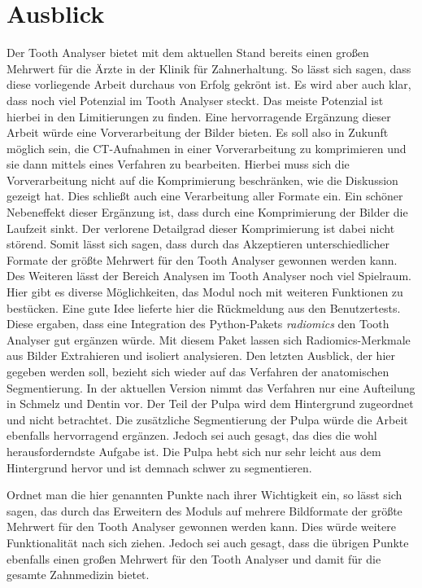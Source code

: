 \chapter{Ausblick}
\label{chap:schlussfolgerung} Der Tooth Analyser bietet mit dem aktuellen Stand bereits
einen großen Mehrwert für die Ärzte in der Klinik für Zahnerhaltung. So lässt
sich sagen, dass diese vorliegende Arbeit durchaus von Erfolg gekrönt ist. Es
wird aber auch klar, dass noch viel Potenzial im Tooth Analyser steckt. Das
meiste Potenzial ist hierbei in den Limitierungen zu finden. Eine hervorragende Ergänzung
dieser Arbeit würde eine Vorverarbeitung der Bilder bieten. Es soll also in
Zukunft möglich sein, die \ac{CT}-Aufnahmen in einer Vorverarbeitung zu
komprimieren und sie dann mittels eines Verfahren zu bearbeiten. Hierbei muss sich
die Vorverarbeitung nicht auf die Komprimierung beschränken, wie die Diskussion
gezeigt hat. Dies schließt auch eine Verarbeitung aller Formate ein. Ein schöner
Nebeneffekt dieser Ergänzung ist, dass durch eine Komprimierung der Bilder die Laufzeit
sinkt. Der verlorene Detailgrad dieser Komprimierung ist dabei nicht störend. Somit
lässt sich sagen, dass durch das Akzeptieren unterschiedlicher Formate der
größte Mehrwert für den Tooth Analyser gewonnen werden kann. Des Weiteren lässt der
Bereich Analysen im Tooth Analyser noch viel Spielraum. Hier gibt es diverse
Möglichkeiten, das Modul noch mit weiteren Funktionen zu bestücken. Eine gute
Idee lieferte hier die Rückmeldung aus den Benutzertests. Diese ergaben, dass
eine Integration des Python-Pakets \textit{radiomics} den Tooth Analyser gut ergänzen
würde. Mit diesem Paket lassen sich Radiomics-Merkmale aus Bilder Extrahieren
und isoliert analysieren. Den letzten Ausblick, der hier gegeben werden soll, bezieht
sich wieder auf das Verfahren der anatomischen Segmentierung. In der aktuellen
Version nimmt das Verfahren nur eine Aufteilung in Schmelz und Dentin vor. Der Teil
der Pulpa wird dem Hintergrund zugeordnet und nicht betrachtet. Die zusätzliche
Segmentierung der Pulpa würde die Arbeit ebenfalls hervorragend ergänzen. Jedoch
sei auch gesagt, das dies die wohl herausforderndste Aufgabe ist. Die Pulpa hebt
sich nur sehr leicht aus dem Hintergrund hervor und ist demnach schwer zu segmentieren.

Ordnet man die hier genannten Punkte nach ihrer Wichtigkeit ein, so lässt sich
sagen, das durch das Erweitern des Moduls auf mehrere Bildformate der größte Mehrwert
für den Tooth Analyser gewonnen werden kann. Dies würde weitere Funktionalität
nach sich ziehen. Jedoch sei auch gesagt, dass die übrigen Punkte ebenfalls
einen großen Mehrwert für den Tooth Analyser und damit für die gesamte Zahnmedizin bietet.
